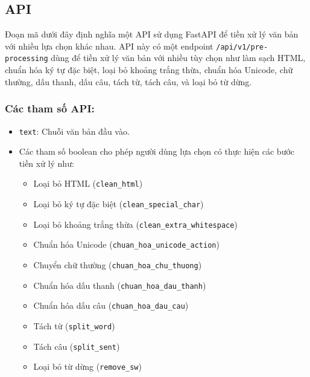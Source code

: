 \subsection{API}

Đoạn mã dưới đây định nghĩa một API sử dụng FastAPI để tiền xử lý văn bản với nhiều lựa chọn khác nhau. API này có một endpoint \texttt{/api/v1/pre-processing} dùng để tiền xử lý văn bản với nhiều tùy chọn như làm sạch HTML, chuẩn hóa ký tự đặc biệt, loại bỏ khoảng trắng thừa, chuẩn hóa Unicode, chữ thường, dấu thanh, dấu câu, tách từ, tách câu, và loại bỏ từ dừng.

\subsubsection{Các tham số API:}
\begin{itemize}
    \item \texttt{text}: Chuỗi văn bản đầu vào.
    \item Các tham số boolean cho phép người dùng lựa chọn có thực hiện các bước tiền xử lý như:
    \begin{itemize}
        \item Loại bỏ HTML (\texttt{clean\_html})
        \item Loại bỏ ký tự đặc biệt (\texttt{clean\_special\_char})
        \item Loại bỏ khoảng trắng thừa (\texttt{clean\_extra\_whitespace})
        \item Chuẩn hóa Unicode (\texttt{chuan\_hoa\_unicode\_action})
        \item Chuyển chữ thường (\texttt{chuan\_hoa\_chu\_thuong})
        \item Chuẩn hóa dấu thanh (\texttt{chuan\_hoa\_dau\_thanh})
        \item Chuẩn hóa dấu câu (\texttt{chuan\_hoa\_dau\_cau})
        \item Tách từ (\texttt{split\_word})
        \item Tách câu (\texttt{split\_sent})
        \item Loại bỏ từ dừng (\texttt{remove\_sw})
    \end{itemize}
\end{itemize}
